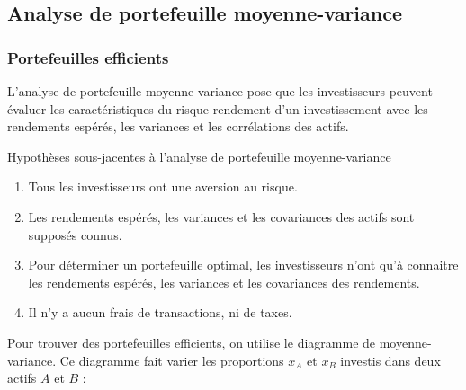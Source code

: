\documentclass[10pt, french]{article}
\begin{document}
\begin{multicols*}{2}
\columnbreak
\subsection{Analyse de portefeuille moyenne-variance}
\subsubsection{Portefeuilles efficients}
\begin{definitionNOHFILL}
L'analyse de portefeuille moyenne-variance pose que les investisseurs peuvent évaluer les caractéristiques du risque-rendement d'un investissement avec les rendements espérés, les variances et les corrélations des actifs.
\end{definitionNOHFILL}

\begin{conceptgen}{Hypothèses sous-jacentes à l'analyse de portefeuille moyenne-variance}
\begin{enumerate}[label	=	\circled{\arabic*}{lightgray}]
	\item	Tous les investisseurs ont une aversion au risque.
	\item	Les rendements espérés, les variances et les covariances des actifs sont supposés connus.
	\item	Pour déterminer un portefeuille optimal, les investisseurs n'ont qu'à connaitre les rendements espérés, les variances et les covariances des rendements.
	\item	Il n'y a aucun frais de transactions, ni de taxes.
\end{enumerate}
\end{conceptgen}

Pour trouver des portefeuilles efficients, on utilise le diagramme de moyenne-variance. Ce diagramme fait varier les proportions $x_{A}$ et $x_{B}$ investis dans deux actifs $A$ et $B$ :
\begin{center}


\begin{tikzpicture}[x=0.75pt,y=0.75pt,yscale=-1,xscale=1]


\end{tikzpicture}
\end{center}
\end{multicols*}
\end{document}
